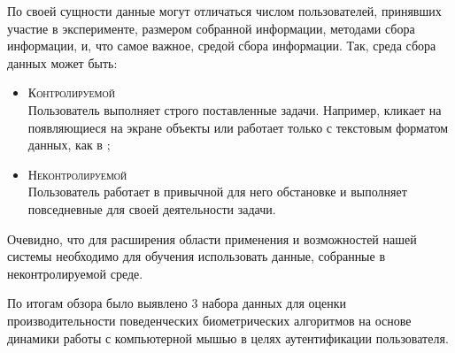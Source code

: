 \documentclass[12pt]{article}
\begin{document}
    \par По своей сущности данные могут отличаться числом пользователей, принявших участие в эксперименте, размером собранной информации, методами сбора информации, и, что самое важное, средой сбора информации. Так, среда сбора данных может быть:

    \begin{itemize}
        \item \textsc{Контролируемой} \\
        Пользователь выполняет строго поставленные задачи. Например, кликает на появляющиеся на экране объекты или работает только с текстовым форматом данных, как в \cite{Borisov};
        \item \textsc{Неконтролируемой} \\
        Пользователь работает в привычной для него обстановке и выполняет повседневные для своей деятельности задачи.
    \end{itemize}

    \par Очевидно, что для расширения области применения и возможностей нашей системы необходимо для обучения использовать данные, собранные в неконтролируемой среде.

    \par По итогам обзора было выявлено 3 набора данных для оценки производительности поведенческих биометрических алгоритмов на основе динамики работы с компьютерной мышью в целях аутентификации пользователя.
\end{document}
